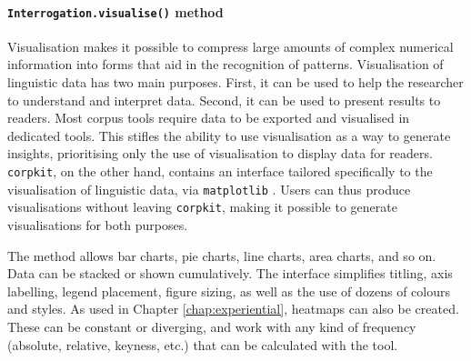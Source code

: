 \paragraph{\texttt{Interrogation.visualise()} method}

Visualisation makes it possible to compress large amounts of complex numerical information into forms that aid in the recognition of patterns. Visualisation of linguistic data has two main purposes. First, it can be used to help the researcher to understand and interpret data. Second, it can be used to present results to readers. Most corpus tools require data to be exported and visualised in dedicated tools. This stifles the ability to use visualisation as a way to generate insights, prioritising only the use of visualisation to display data for readers. \texttt{corpkit}, on the other hand, contains an interface tailored specifically to the visualisation of linguistic data, via \texttt{matplotlib} \cite{matplotlib_2007}. Users can thus produce visualisations without leaving \texttt{corpkit}, making it possible to generate visualisations for both purposes.

The method allows bar charts, pie charts, line charts, area charts, and so on. Data can be stacked or shown cumulatively. The interface simplifies titling, axis labelling, legend placement, figure sizing, as well as the use of dozens of colours and styles. As used in Chapter \ref{chap:experiential}, heatmaps can also be created. These can be constant or diverging, and work with any kind of frequency (absolute, relative, keyness, etc.) that can be calculated with the tool.





